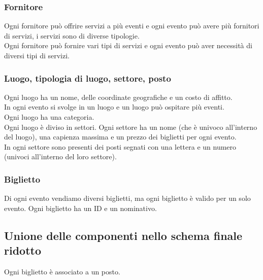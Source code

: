 \documentclass[a4paper,11pt]{article}
\begin{document}

\subsubsection*{Fornitore}

Ogni fornitore può offrire servizi a più eventi e ogni evento può avere più fornitori di servizi, i servizi sono di diverse tipologie.\\
Ogni fornitore può fornire vari tipi di servizi e ogni evento può aver necessità di diversi tipi di servizi.


\subsubsection*{Luogo, tipologia di luogo, settore, posto}

Ogni luogo ha un nome, delle coordinate geografiche e un costo di affitto.\\
In ogni evento si svolge in un luogo e un luogo può ospitare più eventi.\\
Ogni luogo ha una categoria.\\
Ogni luogo è diviso in settori.
Ogni settore ha un nome (che è univoco all'interno del luogo), una capienza massima e un prezzo dei biglietti per ogni evento.\\
In ogni settore sono presenti dei posti segnati con una lettera e un numero (univoci all'interno del loro settore).


\subsubsection*{Biglietto}

Di ogni evento vendiamo diversi biglietti, ma ogni biglietto è valido per un solo evento.
Ogni biglietto ha un ID e un nominativo.


\subsection{Unione delle componenti nello schema finale ridotto}

Ogni biglietto è associato a un posto.
\end{document}
